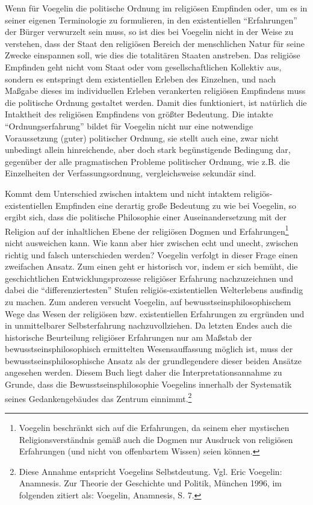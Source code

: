 Wenn für Voegelin die politische Ordnung im religiösen Empfinden oder, um es
in seiner eigenen Terminologie zu formulieren, in den existentiellen
"`Erfahrungen"' der Bürger verwurzelt sein muss, so ist dies bei Voegelin
nicht in der Weise zu verstehen, dass der Staat den religiösen Bereich der
menschlichen Natur für seine Zwecke einspannen soll, wie dies die totalitären
Staaten anstreben. Das religiöse Empfinden geht nicht vom Staat oder vom
gesellschaftlichen Kollektiv aus, sondern es entspringt dem existentiellen
Erleben des Einzelnen, und nach Maßgabe dieses im individuellen Erleben
verankerten religiösen Empfindens muss die politische Ordnung gestaltet werden.
Damit dies funktioniert, ist natürlich die Intaktheit des religiösen
Empfindens von größter Bedeutung. Die intakte "`Ordnungserfahrung"' bildet für
Voegelin nicht nur eine notwendige Voraussetzung (guter) politischer Ordnung,
sie stellt auch eine, zwar nicht unbedingt allein hinreichende, aber doch
stark begünstigende Bedingung dar, gegenüber der alle pragmatischen Probleme
politischer Ordnung, wie z.B. die Einzelheiten der Verfassungsordnung,
vergleichsweise sekundär sind.

Kommt dem Unterschied zwischen intaktem und nicht intaktem
religiös-existentiellen Empfinden eine derartig große Bedeutung zu wie bei
Voegelin, so ergibt sich, dass die politische Philosophie einer
Auseinandersetzung mit der Religion auf der inhaltlichen Ebene der religiösen
Dogmen und Erfahrungen\footnote{Voegelin beschränkt sich auf die Erfahrungen,
  da seinem eher mystischen Religionsverständnis gemäß auch die Dogmen nur
  Ausdruck von religiösen Erfahrungen (und nicht von offenbartem Wissen)
  seien können.} nicht ausweichen kann. Wie kann aber hier zwischen echt und
unecht, zwischen richtig und falsch unterschieden werden?  Voegelin verfolgt
in dieser Frage einen zweifachen Ansatz. Zum einen geht er historisch vor,
indem er sich bemüht, die geschichtlichen Entwicklungsprozesse religiöser
Erfahrung nachzuzeichnen und dabei die "`differenziertesten"' Stufen
religiös-existentiellen Welterlebens ausfindig zu machen. Zum anderen versucht
Voegelin, auf bewusstseinsphilosophischem Wege das Wesen der religiösen bzw.
existentiellen Erfahrungen zu ergründen und in unmittelbarer Selbsterfahrung
nachzuvollziehen. Da letzten Endes auch die historische Beurteilung religiöser
Erfahrungen nur am Maßstab der bewusstseinsphilosophisch ermittelten
Wesensauf\/fassung möglich ist, muss der bewusstseinsphilosophische Ansatz als
der grundlegendere dieser beiden Ansätze angesehen werden. Diesem Buch liegt
daher die Interpretationsannahme zu Grunde, dass die Bewusstseinsphilosophie
Voegelins innerhalb der Systematik seines Gedankengebäudes das Zentrum
einnimmt.\footnote{Diese Annahme entspricht Voegelins Selbstdeutung.  Vgl.
  Eric Voegelin: Anamnesis. Zur Theorie der Geschichte und Politik, München
  1996, im folgenden zitiert als: Voegelin, Anamnesis, S. 7.}

